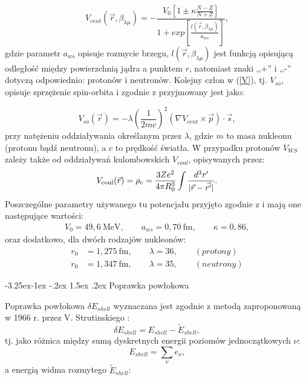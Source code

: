 \documentclass[a4paper,polish,twoside]{article}
\makeatletter
\renewcommand\subsubsection{\@startsection{subsubsection}{3}{\z@}%
	{-3.25ex\@plus -1ex \@minus -.2ex}%
	{1.5ex \@plus .2ex}%
	{\normalfont\normalsize\bfseries\boldmath}}
\numberwithin{equation}{section}
\makeatother
\begin{document}
\begin{equation}
V_{cent}(\vec{r},\beta_{\lambda \mu}) =  - \frac{V_0 \left[ 1 \pm \kappa \frac{N-Z}{N+Z} \right]}{1+exp \left [ \frac {l(\vec{r},\beta_{\lambda \mu})}{a_{ws}} \right ]},
\end{equation}
gdzie parametr $a_{ws}$ opisuje rozmycie brzegu, $l(\vec{r},\beta_{\lambda \mu})$ jest funkcją opisującą odległość między powierzchnią jądra a punktem $r$, natomiast znaki ,,+'' i ,,-'' dotyczą odpowiednio: protonów i neutronów. Kolejny człon w (\ref{V}), tj. $V_{so}$, opisuje sprzężenie spin-orbita i zgodnie z \cite{WS} przyjmowany jest jako: 

\begin{equation}
V_{so}(\vec{r})=-\lambda\left(\frac{1}{2mc}\right)^2 \left( \nabla V_{cent}  \times\vec{p} \right) \cdot \vec{s} ,
\end{equation}
przy natężeniu oddziaływania określanym przez $\lambda$, gdzie $m$ to masa nukleonu (protonu bądź neutronu), a $c$ to prędkość światła. W przypadku protonów $V_{WS}$ zależy także od oddziaływań kulombowskich $V_{coul}$, opisywanych przez:
\begin{equation}
V_{\rm coul}(\vec{r})=\rho_{\rm c}=\frac{3Ze^2}{4\pi R_0^3} \int\frac{d^3r'}{|\vec{r}-\vec{r'}|}.
\end{equation}
Poszczególne parametry używanego tu potencjału przyjęto zgodnie z \cite{WS} i mają one następujące wartości:
\begin{gather*}
V_0=49,6~\mathrm{MeV}, \qquad a_{ws}=0,70~\mathrm{fm}, \qquad \kappa=0,86,
\end{gather*}
oraz dodatkowo, dla dwóch rodzajów nukleonów:
\begin{align*}
r_0&=1,275~\mathrm{fm}, \qquad \lambda=36, \qquad (protony) \\
r_0&=1,347~\mathrm{fm}, \qquad \lambda=35, \qquad (neutrony)
\end{align*}

\subsubsection{Poprawka powłokowa}

Poprawka powłokowa $\delta E_{shell}$ wyznaczana jest zgodnie z metodą zaproponowaną w 1966 r. przez V. Strutinskiego \cite{Strutin}:
\begin{equation}\label{ESH}
\delta E_{shell}=E_{shell}-\widetilde{E}_{shell},
\end{equation}
tj. jako różnica między sumą dyskretnych energii poziomów jednoczątkowych $\nu$:  
\begin{equation}
E_{shell}=\sum_{\nu} e_{\nu},
\end{equation}
a energią widma rozmytego $\widetilde{E}_{shell}$:
\end{document}

